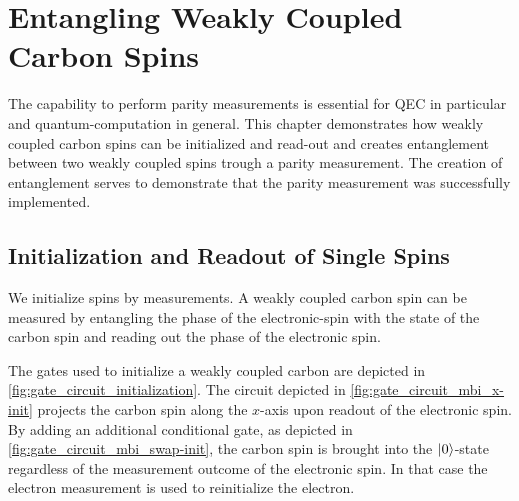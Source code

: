 \chapter{Entangling Weakly Coupled Carbon Spins}
\label{chap:control_weakly_carbon}
The capability to perform parity measurements is essential for QEC in particular and quantum-computation in general.
This chapter demonstrates how weakly coupled carbon spins can be initialized and read-out and creates entanglement between two weakly coupled spins trough a parity measurement.
The creation of entanglement serves to demonstrate that the parity measurement was successfully implemented.

\section{Initialization and Readout of Single Spins}
\label{sec:carbon_init_and_readout}
We initialize spins by measurements.
A weakly coupled carbon spin can be measured by entangling the phase of the electronic-spin with the state of the carbon spin and reading out the phase of the electronic spin.

The gates used to initialize a weakly coupled carbon are depicted in \cref{fig:gate_circuit_initialization}.
The circuit depicted in \cref{fig:gate_circuit_mbi_x-init} projects the carbon spin along the $x$-axis upon readout of the electronic spin.
By adding an additional conditional gate, as depicted in \cref{fig:gate_circuit_mbi_swap-init}, the carbon spin is brought into the ${\left\vert{0}\right\rangle}$-state regardless of the measurement outcome of the electronic spin.
In that case the electron measurement is used to reinitialize the electron.

